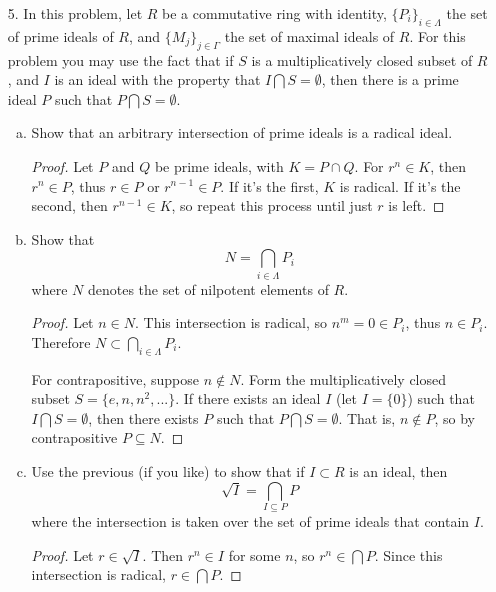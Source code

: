 \begin{itemize}
\begin{enumerate}[(a)]
\begin{proof}
\end{proof}
\end{enumerate}













\item[5.] In this problem, let $R$ be a commutative ring with identity, $\{P_i\}_{i \in \Lambda}$ the set of prime
ideals of $R$, and $\{M_j\}_{j \in \Gamma}$ the set of maximal ideals of $R$. For this problem you may
use the fact that if $S$ is a multiplicatively closed subset of $R$, and $I$ is an ideal with
the property that $I \bigcap S = \emptyset$, then there is a prime ideal $P$ such that $P \bigcap S = \emptyset$.
\begin{enumerate}[(a)]
\item Show that an arbitrary intersection of prime ideals is a radical ideal.
\begin{proof}
Let $P$ and $Q$ be prime ideals, with $K = P \cap Q$. For $r^n \in K$, then $r^n \in P$, thus $r \in P$ or $r^{n-1} \in P$. If it's the first, $K$ is radical. If it's the second, then $r^{n-1} \in K$, so repeat this process until just $r$ is left. 
\end{proof}

\item Show that 
$$N = \bigcap_{i \in \Lambda} P_i$$
where $N$ denotes the set of nilpotent elements of $R$.
\begin{proof}
Let $n \in N$. This intersection is radical, so $n^m = 0 \in P_i$, thus $n \in P_i$. Therefore $N \subset \bigcap_{i \in \Lambda} P_i$.

\medskip 

For contrapositive, suppose $n \not\in N$. Form the multiplicatively closed subset $S = \{e, n, n^2, ...\}$. If there exists an ideal $I$ (let $I=\{0\}$) such that $I \bigcap S = \emptyset$, then there exists $P$ such that $P \bigcap S = \emptyset$. That is, $n \not\in P$, so by contrapositive $P \subseteq N$.
\end{proof}

\item Use the previous (if you like) to show that if $I \subset R$ is an ideal, then
$$\sqrt{I} = \bigcap_{I \subseteq P} P$$
where the intersection is taken over the set of prime ideals that contain $I$.
\begin{proof}
Let $r \in \sqrt{I}$. Then $r^n \in I$ for some $n$, so $r^n \in \bigcap P$. Since this intersection is radical, $r \in \bigcap P$.


\end{proof}
\end{enumerate}
\end{itemize}
